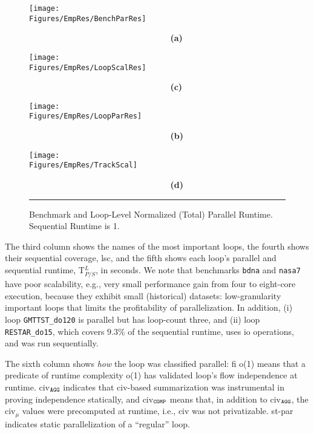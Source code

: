 \documentclass{sig-alternate}
\newcommand{\Figures}[1]{../Figures/}
\begin{document}
\begin{figure*}[t]
\begin{minipage}{1.2\columnwidth}
    \texttt{[image: \\Figures/EmpRes/BenchParRes]}

      {\bf~~~~~~~~~~~~~~~~~~~~~~~~~~~~~(a)} \vspace{2ex}

    \texttt{[image: \\Figures/EmpRes/LoopScalRes]}
      
      {\bf~~~~~~~~~~~~~~~~~~~~~~~~~~~~~(c)}\vspace{1ex}

\end{minipage}
\begin{minipage}{0.9\columnwidth}
    \texttt{[image: \\Figures/EmpRes/LoopParRes]} 

      {\bf~~~~~~~~~~~~~~~~~~~~~~~~~~~~~(b)}\vspace{2ex}

   \texttt{[image: \\Figures/EmpRes/TrackScal]}
      
      {\bf~~~~~~~~~~~~~~~~~~~~~~~~~~~~~(d)}\vspace{1ex}

\end{minipage}
\hrule
\caption{ Benchmark and Loop-Level Normalized (Total) Parallel Runtime. Sequential Runtime is 1.}
\label{fig:ParRuntime} %
\end{figure*}


The third column shows the names of the most important loops,
the fourth shows their sequential coverage, {\sc lsc}, and the
fifth shows each loop's parallel and sequential runtime, T$_{P/S}^L$, in seconds.
%
We note that benchmarks {\tt bdna} and {\tt nasa7} have poor scalability, e.g., very small
performance gain from four to eight-core execution, because they exhibit
small (historical) datasets: low-granularity important loops that limits the 
profitability of parallelization.
In addition, (i) loop {\tt GMTTST\_do120} 
is parallel but has loop-count three, and (ii) loop {\tt RESTAR\_do15},
which covers $9.3\%$ of the sequential runtime, uses {\sc io} operations,
and was run sequentially. 

The sixth column shows {\em how} the loop was classified parallel: {\sc fi} {\sc o(1)}
means that a predicate of runtime complexity {\sc o(1)} has validated loop's flow
independence at runtime. {\sc civ}$_{\tt{}AGG}$ indicates that {\sc civ}-based summarization 
was instrumental in proving independence statically, and {\sc civ}$_{\tt{}COMP}$ means that,
in addition to {\sc civ}$_{\tt{}AGG}$, the {\sc civ}$_\mu$ values were precomputed
at runtime, i.e., {\sc civ} was not privatizable.  {\sc st-par} indicates static
parallelization of a ``regular'' loop. 
\end{document}
